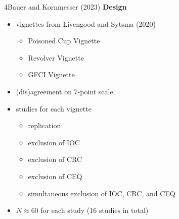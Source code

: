 \documentclass[xcolor=table,9pt,aspectratio=169]{beamer}
\begin{document}
\begin{frame}{\vspace*{10mm}4\hspace*{1em}Bauer and Kornmesser (2023)}
\vspace*{-5mm}
\textbf{Design}\\
\begin{itemize}
   \item vignettes from Livengood and Sytsma (2020)
      \begin{itemize}
         \item Poisoned Cup Vignette
         \item Revolver Vignette
         \item GFCI Vignette
      \end{itemize}
   \item (dis)agreement on 7-point scale
   \item studies for each vignette
      \begin{itemize}
         \item replication
         \item exclusion of IOC
         \item exclusion of CRC
         \item exclusion of CEQ
         \item simultaneous exclusion of IOC, CRC, and CEQ
      \end{itemize}
   \item $N\approx 60$ for each study (16 studies in total)
\end{itemize}
\end{frame}
\end{document}
